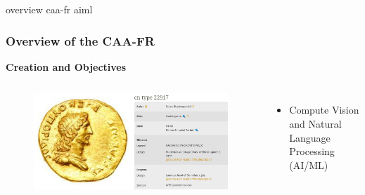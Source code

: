 \documentclass[t,aspectratio=169,xcolor=dvipsnames]{beamer}
\begin{document}

\begin{frame}{overview caa-fr aiml}

    \frametitle{Overview of the CAA-FR} 

    \begin{block}{\textbf{Creation and Objectives}} %
    \end{block}

    \begin{columns}[t]
    	
    	
    	\begin{figure}
    		\includegraphics[height=0.48\textheight]{figures/AI_ML.jpg}
    	\end{figure}
    	
    	
    	\begin{itemize}
    		\item Compute Vision and Natural Language Processing (AI/ML)
    	\end{itemize}
    	
    \end{columns}

    \end{frame}

\end{document}
